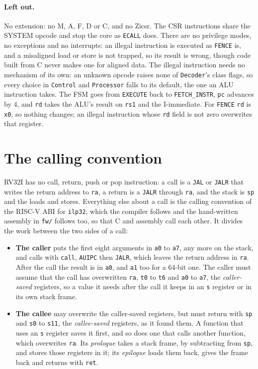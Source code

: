 \documentclass[11pt,a4paper]{report}
\begin{document}
\paragraph{Left out.} No extension: no M, A, F, D or C, and no Zicsr. The CSR instructions
share the SYSTEM opcode and stop the core as \texttt{ECALL} does. There are no privilege
modes, no exceptions and no interrupts: an illegal instruction is executed as \texttt{FENCE}
is, and a misaligned load or store is not trapped, so its result is wrong, though code built
from C never makes one for aligned data. The illegal instruction needs no mechanism of its own:
an unknown opcode raises none of \texttt{Decoder}'s class flags, so every choice in
\texttt{Control} and \texttt{Processor} falls to its default, the one an ALU instruction
takes. The FSM goes from \texttt{EXECUTE} back to \texttt{FETCH\_INSTR}, \texttt{pc} advances
by 4, and \texttt{rd} takes the ALU's result on \texttt{rs1} and the I-immediate. For
\texttt{FENCE} \texttt{rd} is \texttt{x0}, so nothing changes; an illegal instruction whose
\texttt{rd} field is not zero overwrites that register.

\section{The calling convention}
\label{sec:isa-calls}

RV32I has no call, return, push or pop instruction: a call is a \texttt{JAL} or \texttt{JALR}
that writes the return address to \texttt{ra}, a return is a \texttt{JALR} through
\texttt{ra}, and the stack is \texttt{sp} and the loads and stores. Everything else about a
call is the calling convention of the RISC-V ABI for \texttt{ilp32}, which the compiler
follows and the hand-written assembly in \texttt{fw/} follows too, so that C and assembly call
each other. It divides the work between the two sides of a call:

\begin{itemize}[leftmargin=*, itemsep=2pt]
  \item \textbf{The caller} puts the first eight arguments in \texttt{a0} to \texttt{a7}, any
    more on the stack, and calls with \texttt{call}, \texttt{AUIPC} then \texttt{JALR}, which
    leaves the return address in \texttt{ra}. After the call the result is in \texttt{a0}, and
    \texttt{a1} too for a 64-bit one. The caller must assume that the call has overwritten
    \texttt{ra}, \texttt{t0} to \texttt{t6} and \texttt{a0} to \texttt{a7}, the
    \emph{caller-saved} registers, so a value it needs after the call it keeps in an
    \texttt{s} register or in its own stack frame.
  \item \textbf{The callee} may overwrite the caller-saved registers, but must return with
    \texttt{sp} and \texttt{s0} to \texttt{s11}, the \emph{callee-saved} registers, as it
    found them. A function that uses an \texttt{s} register saves it first, and so does one
    that calls another function, which overwrites \texttt{ra}. Its \emph{prologue} takes a
    stack frame, by subtracting from \texttt{sp}, and stores those registers in it; its
    \emph{epilogue} loads them back, gives the frame back and returns with \texttt{ret}.
\end{itemize}
\end{document}
